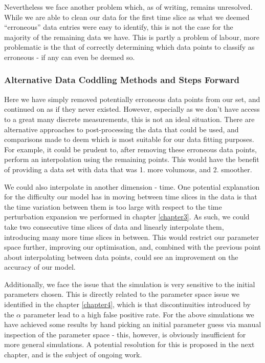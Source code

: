 Nevertheless we face another problem which, as of writing, remains unresolved. While we are able to clean our data 
for the first time slice as what we deemed ``erroneous'' data entries were easy to identify, this is not the case for the majority 
of the remaining data we have. This is partly a problem of labour, more problematic is the that of correctly determining which 
data points to classify as erroneous - if any can even be deemed so.



\subsubsection{Alternative Data Coddling Methods and Steps Forward}
Here we have simply removed potentially erroneous data points from our set, and continued on as if they never existed. 
However, especially as we don't have access to a great many discrete measurements, this is not an ideal situation. 
There are alternative approaches to post-processing the data that could be used, and comparisons made to deem which is 
most suitable for our data fitting purposes. For example, it could be prudent to, after removing these erroneous data points, 
perform an interpolation using the remaining points. This would have the benefit of providing a data set with data that was 1. 
more volumous, and 2. smoother.

We could also interpolate in another dimension - time. One potential explanation for the difficulty our model has in moving between 
time slices in the data is that the time variation between them is too large with respect to the time perturbation expansion we performed 
in chapter \ref{chapter3}. As such, we could take two consecutive time slices of data and linearly interpolate them, introducing 
many more time slices in between. This would restrict our parameter space further, improving our optimisation, and, combined with 
the previous point about interpolating between data points, could see an improvement on the accuracy of our model.

Additionally, we face the issue that the simulation is very sensitive to the initial parameters chosen. This is directly related 
to the parameter space issue we identified in the chapter \ref{chapter4}, which is that discontinuities introduced by the $\alpha$ 
parameter lead to a high false positive rate. For the above simulations we have achieved some 
results by hand picking an initial parameter guess via manual inspection of the parameter space - this, however, is obviously insufficient 
for more general simulations. A potential resolution for this is proposed in the next chapter, and is the subject of ongoing work.
